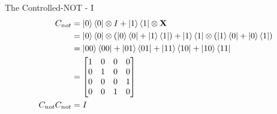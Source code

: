 \documentclass{beamer}
\begin{document}
\begin{frame}{The Controlled-NOT - I}
{\begin{align*}
      C_{not} &= \ket0\bra0 \otimes I + \ket1\bra1 \otimes \mathbf{X} \\
              &= \ket0\bra0 \otimes (\ket0\bra0 +\ket1\bra1) + \ket1\bra1 \otimes (\ket1\bra0 + \ket0\bra1) \\
              &= \ket{00}\bra{00} + \ket{01}\bra{01} + \ket{11}\bra{10} + \ket{10}\bra{11} \\
              &= \begin{bmatrix} 1 & 0 & 0 & 0 \\ 0 & 1 & 0 & 0 \\ 0 & 0 & 0 & 1 \\ 0 & 0 & 1 & 0 \end{bmatrix} \\
      C_{not}C_{not} &= I
    \end{align*}
  }%
\end{frame}
\end{document}
